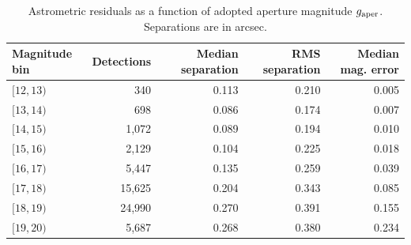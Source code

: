 \begin{table}[!htbp]
\centering
\caption{Astrometric residuals as a function of adopted aperture magnitude $g_{\rm aper}$. Separations are in arcsec.}
\label{tab:mag_astrometry}
\footnotesize
\setlength{\tabcolsep}{6pt}
\renewcommand{\arraystretch}{1.12}
\begin{tabular}{lrrrr}
\toprule
Magnitude bin & Detections & Median separation & RMS separation & Median mag. error \\
\midrule
$[12,13)$ & 340 & 0.113 & 0.210 & 0.005 \\
$[13,14)$ & 698 & 0.086 & 0.174 & 0.007 \\
$[14,15)$ & 1,072 & 0.089 & 0.194 & 0.010 \\
$[15,16)$ & 2,129 & 0.104 & 0.225 & 0.018 \\
$[16,17)$ & 5,447 & 0.135 & 0.259 & 0.039 \\
$[17,18)$ & 15,625 & 0.204 & 0.343 & 0.085 \\
$[18,19)$ & 24,990 & 0.270 & 0.391 & 0.155 \\
$[19,20)$ & 5,687 & 0.268 & 0.380 & 0.234 \\
\bottomrule
\end{tabular}
\end{table}
